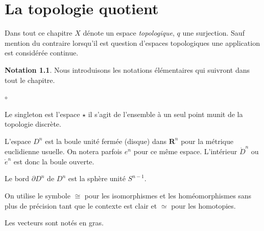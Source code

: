 \documentclass[12pt]{book}
\theoremstyle{definition}
\newtheorem*{notation}{Notation}
\theoremstyle{remark}
\begin{document}
	\chapter{La topologie quotient}
	Dans tout ce chapitre $X$ dénote un espace \emph{topologique}, $q$ une surjection. Sauf mention du contraire lorsqu'il est question d'espaces topologiques une application est considérée continue.

	\begin{notation}
		Nous introduisons les notations élémentaires qui suivront dans tout le chapitre.
		\begin{list}{$\circ$}{}
			\item Le singleton est l'espace $\star$ il s'agit de l'ensemble à un seul point munit de la topologie discrète. 
			\item L'espace $D^n$ est la boule unité fermée (disque) dans $\mathbf{R}^{n}$ pour la métrique euclidienne usuelle. On notera parfois $e^{n}$ pour ce même espace. L'intérieur $\mathring{D}^n$ ou $\mathring{e}^n$ est donc la boule ouverte. 
			\item Le bord $\partial D^n$ de $D^n$ est la sphère unité $S^{n-1}$. 
			\item On utilise le symbole $\cong$ pour les isomorphismes et les homéomorphismes sans plus de précision tant que le contexte est clair et $\simeq$ pour les homotopies.
			\item Les vecteurs sont notés en gras.
		\end{list}
	\end{notation}
\end{document}
